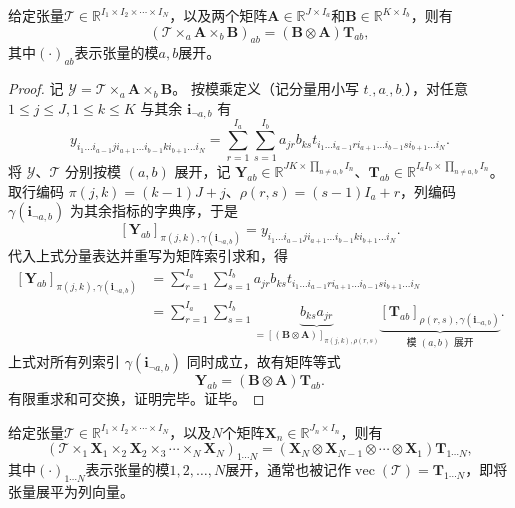 \begin{property}\label{prop:kronecker-kron}
    给定张量\( \mathcal{T} \in \mathbb{R}^{I_1 \times I_2 \times \cdots \times I_N} \)，以及两个矩阵\( \mathbf{A} \in \mathbb{R}^{J \times I_a} \)和\( \mathbf{B} \in \mathbb{R}^{K \times I_b} \)，则有
    \[
        (\mathcal{T} \times_a \mathbf{A} \times_b \mathbf{B})_{ab} = (\mathbf{B} \otimes \mathbf{A}) \mathbf{T}_{ab},
    \]
    其中\( (\cdot)_{ab} \)表示张量的模\( a,b \)展开。
\end{property}
\begin{proof}
    记 \(\mathcal{Y}=\mathcal{T}\times_a \mathbf{A}\times_b \mathbf{B}\)。
    按模乘定义（记分量用小写 \(t_{\cdot},a_{\cdot},b_{\cdot}\)），对任意
    \(1\le j\le J,1\le k\le K\) 与其余 \(\bm{i}_{\neg a,b}\) 有
    \[
        y_{i_1 \dots i_{a-1} j i_{a+1} \dots i_{b-1} k i_{b+1} \dots i_N}
        =
        \sum_{r=1}^{I_a}\sum_{s=1}^{I_b}
        a_{j r} b_{k s}
        t_{i_1 \dots i_{a-1} r i_{a+1} \dots i_{b-1} s i_{b+1} \dots i_N}.
    \]
    将 \(\mathcal{Y}\)、\(\mathcal{T}\) 分别按模 \((a,b)\) 展开，记
    \(\mathbf{Y}_{ab}\in\mathbb{R}^{JK\times \prod_{n\neq a,b} I_n}\)、\(\mathbf{T}_{ab}\in\mathbb{R}^{I_aI_b\times \prod_{n\neq a,b} I_n}\)。
    取行编码
    \(\pi(j,k)=(k-1)J+j\)、\(\rho(r,s)=(s-1)I_a+r\)，列编码
    \(\gamma(\bm{i}_{\neg a,b})\) 为其余指标的字典序，于是
    \[
        [\mathbf{Y}_{ab}]_{\pi(j,k),\gamma(\bm{i}_{\neg a,b})}
        =
        y_{i_1 \dots i_{a-1} j i_{a+1} \dots i_{b-1} k i_{b+1} \dots i_N}.
    \]
    代入上式分量表达并重写为矩阵索引求和，得
    \[
        \begin{aligned}
            [\mathbf{Y}_{ab}]_{\pi(j,k),\gamma(\bm{i}_{\neg a,b})}
             & = \sum_{r=1}^{I_a}\sum_{s=1}^{I_b}
            a_{j r} b_{k s}
            t_{i_1 \dots i_{a-1} r i_{a+1} \dots i_{b-1} s i_{b+1} \dots i_N} \\
             & = \sum_{r=1}^{I_a}\sum_{s=1}^{I_b}
            \underbrace{b_{k s} a_{j r}}_{=[(\mathbf{B}\otimes\mathbf{A})]_{\pi(j,k),\rho(r,s)}}
            \underbrace{[\mathbf{T}_{ab}]_{\rho(r,s),\gamma(\bm{i}_{\neg a,b})}}_{\text{模 }(a,b)\text{ 展开}} .
        \end{aligned}
    \]
    上式对所有列索引 \(\gamma(\bm{i}_{\neg a,b})\) 同时成立，故有矩阵等式
    \[
        \mathbf{Y}_{ab} = (\mathbf{B}\otimes\mathbf{A})\mathbf{T}_{ab}.
    \]
    有限重求和可交换，证明完毕。证毕。
\end{proof}

\begin{corollary}\label{cor:kronecker-kron}
    给定张量\( \mathcal{T} \in \mathbb{R}^{I_1 \times I_2 \times \cdots \times I_N} \)，以及\( N \)个矩阵\( \mathbf{X}_n \in \mathbb{R}^{J_n \times I_n} \)，则有
    \[
        (\mathcal{T} \times_1 \mathbf{X}_1 \times_2 \mathbf{X}_2 \times_3 \cdots \times_N \mathbf{X}_N)_{1\cdots N} = (\mathbf{X}_N \otimes \mathbf{X}_{N-1} \otimes \cdots \otimes \mathbf{X}_1) \mathbf{T}_{1\cdots N},
    \]
    其中\( (\cdot)_{1\cdots N} \)表示张量的模\( 1,2,\ldots,N \)展开，通常也被记作\( \operatorname{vec}( \mathcal{T} ) = \mathbf{T}_{1\cdots N} \)，即将张量展平为列向量。
\end{corollary}

